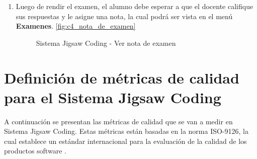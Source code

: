 \begin{enumerate}
	\item Luego de rendir el examen, el alumno debe esperar a que el docente califique sus respuestas y le asigne una nota, la cual podrá ser vista en el menú \textbf{Examenes}. \autoref{fig:c4_nota_de_examen}
	
	\begin{figure}[h!]
		\centering
		\caption{Sistema Jigsaw Coding - Ver nota de examen}
		\label{fig:c4_nota_de_examen}
	\end{figure}
	
\end{enumerate}
\clearpage
\section{Definición de métricas de calidad para el Sistema Jigsaw Coding}
\label{sec:metricas_calidad}
A continuación se presentan las métricas de calidad que se van a medir en Sistema Jigsaw Coding. Estas métricas están basadas en la norma ISO-9126, la cual establece un estándar internacional para la evaluación de la calidad de los productos software \cite{iso9126-3}.

